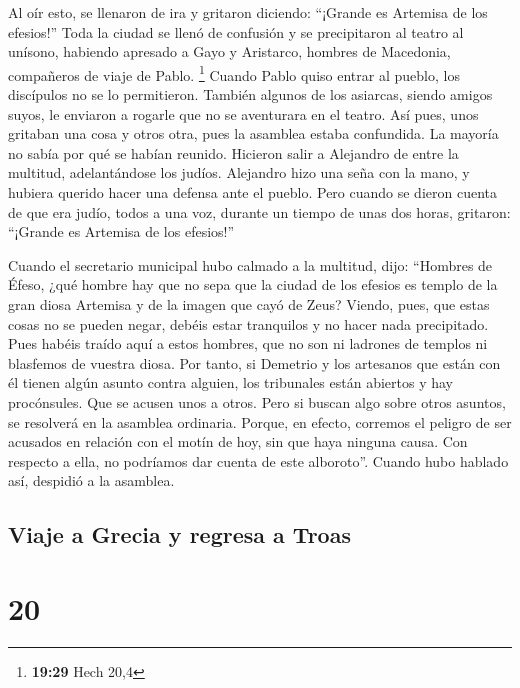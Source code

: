  Al oír esto, se llenaron de ira y gritaron diciendo:
``¡Grande es Artemisa de los efesios!''  Toda la ciudad
se llenó de confusión y se precipitaron al teatro al unísono, habiendo
apresado a Gayo y Aristarco, hombres de Macedonia, compañeros de viaje
de Pablo. \footnote{\textbf{19:29} Hech 20,4}  Cuando
Pablo quiso entrar al pueblo, los discípulos no se lo permitieron.
 También algunos de los asiarcas, siendo amigos suyos, le
enviaron a rogarle que no se aventurara en el teatro. 
Así pues, unos gritaban una cosa y otros otra, pues la asamblea estaba
confundida. La mayoría no sabía por qué se habían reunido.
 Hicieron salir a Alejandro de entre la multitud,
adelantándose los judíos. Alejandro hizo una seña con la mano, y hubiera
querido hacer una defensa ante el pueblo.  Pero cuando se
dieron cuenta de que era judío, todos a una voz, durante un tiempo de
unas dos horas, gritaron: ``¡Grande es Artemisa de los efesios!''

 Cuando el secretario municipal hubo calmado a la
multitud, dijo: ``Hombres de Éfeso, ¿qué hombre hay que no sepa que la
ciudad de los efesios es templo de la gran diosa Artemisa y de la imagen
que cayó de Zeus?  Viendo, pues, que estas cosas no se
pueden negar, debéis estar tranquilos y no hacer nada precipitado.
 Pues habéis traído aquí a estos hombres, que no son ni
ladrones de templos ni blasfemos de vuestra diosa.  Por
tanto, si Demetrio y los artesanos que están con él tienen algún asunto
contra alguien, los tribunales están abiertos y hay procónsules. Que se
acusen unos a otros.  Pero si buscan algo sobre otros
asuntos, se resolverá en la asamblea ordinaria.  Porque,
en efecto, corremos el peligro de ser acusados en relación con el motín
de hoy, sin que haya ninguna causa. Con respecto a ella, no podríamos
dar cuenta de este alboroto''.  Cuando hubo hablado así,
despidió a la asamblea.

\hypertarget{viaje-a-grecia-y-regresa-a-troas}{%
\subsection{Viaje a Grecia y regresa a
Troas}\label{viaje-a-grecia-y-regresa-a-troas}}

\hypertarget{section-19}{%
\section{20}\label{section-19}}

